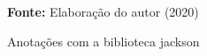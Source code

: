 \begin{figure}[ht!]
\centering

\caption{\textmd{Anotações com a biblioteca jackson}}
\label{fig:jsonjackson}

\par\medskip\textbf{Fonte:} Elaboração do autor (2020) \par\medskip

\end{figure}

